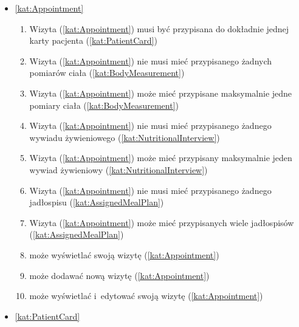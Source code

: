 \begin{itemize}[label={\textbf{Reguły dla}}, wide, labelwidth=!, labelindent=0pt]
    \setlength\itemsep{1.75em}
    \item\ref{kat:Appointment}\mynobreakpar
    \begin{enumerate}[label={\textbf{REG/5/\protect\twodigits{\arabic{enumi}}}}, wide, labelwidth=!, align=left, leftmargin=3cm]
        \item Wizyta (\ref{kat:Appointment}) musi być przypisana do dokładnie jednej karty pacjenta (\ref{kat:PatientCard})
        \item Wizyta (\ref{kat:Appointment}) nie musi mieć przypisanego żadnych pomiarów ciała (\ref{kat:BodyMeasurement})
        \item Wizyta (\ref{kat:Appointment}) może mieć przypisane maksymalnie jedne pomiary ciała (\ref{kat:BodyMeasurement})
        \item Wizyta (\ref{kat:Appointment}) nie musi mieć przypisanego żadnego wywiadu żywieniowego (\ref{kat:NutritionalInterview})
        \item Wizyta (\ref{kat:Appointment}) może mieć przypisany maksymalnie jeden wywiad żywieniowy (\ref{kat:NutritionalInterview})
        \item Wizyta (\ref{kat:Appointment}) nie musi mieć przypisanego żadnego jadłospisu (\ref{kat:AssignedMealPlan})
        \item Wizyta (\ref{kat:Appointment}) może mieć przypisanych wiele jadłospisów (\ref{kat:AssignedMealPlan})
        \item {} może wyświetlać swoją wizytę (\ref{kat:Appointment})
        \item {} może dodawać nową wizytę (\ref{kat:Appointment})
        \item {} może wyświetlać i~edytować swoją wizytę (\ref{kat:Appointment})
    \end{enumerate}
    \item\ref{kat:PatientCard}\mynobreakpar
    \begin{enumerate}[label={\textbf{REG/5/\protect\twodigits{\arabic{enumi}}}}, wide, labelwidth=!, align=left, leftmargin=3cm, resume]

\end{enumerate}
\end{itemize}
